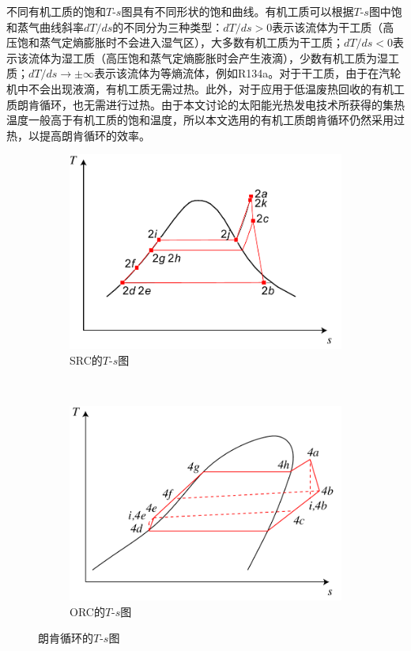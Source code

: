不同有机工质的饱和$T$-$s$图具有不同形状的饱和曲线。有机工质可以根据$T$-$s$图中饱和蒸气曲线斜率$dT/ds$的不同分为三种类型：$dT / ds > 0$表示该流体为干工质（高压饱和蒸气定熵膨胀时不会进入湿气区），大多数有机工质为干工质；$dT / ds < 0$表示该流体为湿工质（高压饱和蒸气定熵膨胀时会产生液滴），少数有机工质为湿工质；$dT/ds \rightarrow \pm\infty$表示该流体为等熵流体，例如R134a。对于干工质，由于在汽轮机中不会出现液滴，有机工质无需过热。此外，对于应用于低温废热回收的有机工质朗肯循环，也无需进行过热。由于本文讨论的太阳能光热发电技术所获得的集热温度一般高于有机工质的饱和温度，所以本文选用的有机工质朗肯循环仍然采用过热，以提高朗肯循环的效率。

\noindent \begin{figure}[htbp]
\centering
	\begin{subfigure}[b]{0.35\columnwidth}
	\includegraphics[width = \columnwidth]{fig/Ts_a.pdf}
	\caption{SRC的$T$-$s$图}\label{fig:Ts_Water}
	\end{subfigure}
	~
\begin{subfigure}[b]{0.35\columnwidth}
	\includegraphics[width = \columnwidth]{fig/Ts_b.pdf}
	\caption{ORC的$T$-$s$图}\label{fig:Ts_organic}
	\end{subfigure}
	
	\caption{朗肯循环的$T$-$s$图}\label{fig:Ts}
\end{figure}


